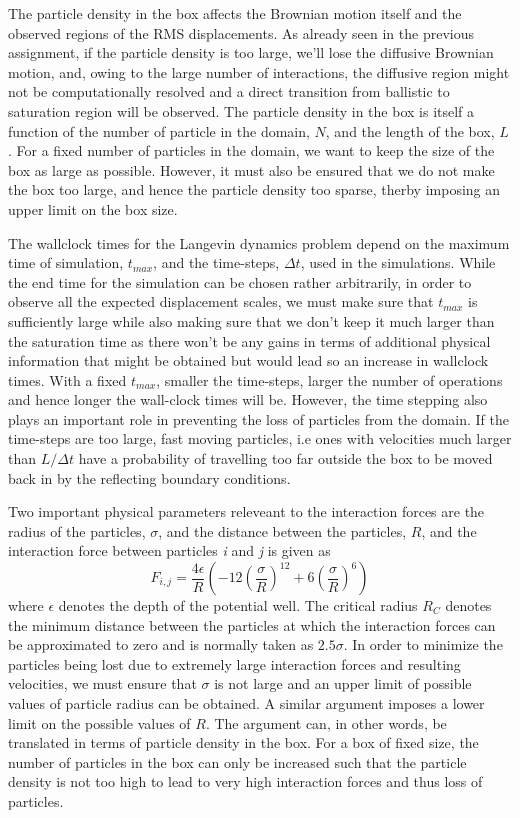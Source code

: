 \documentclass[11pt, oneside]{article}
\begin{document}
The particle density in the box affects the Brownian motion itself and the  observed regions of the RMS displacements. As already seen in the previous assignment, if the particle density is too large, we'll lose the diffusive Brownian motion, and, owing to the large number of interactions, the diffusive region might not be computationally resolved and a direct transition from ballistic to saturation region will be observed. The particle density in the box is itself a function of the number of particle in the domain, $N$, and the length of the box, $L$. For a fixed number of particles in the domain, we want to keep the size of the box as large as possible. However, it must also be ensured that we do not make the box too large, and hence the particle density too sparse, therby imposing an upper limit on the box size.

The wallclock times for the Langevin dynamics problem depend on the maximum time of simulation, $t_{max}$, and the time-steps, $\Delta t$, used in the simulations. While the end time for the simulation can be chosen rather arbitrarily, in order to observe all the expected displacement scales, we must make sure that $t_{max}$ is sufficiently large while also making sure that we don't keep it much larger than the saturation time as there won't be any gains in terms of additional physical information that might be obtained but would lead so an increase in wallclock times. With a fixed  $t_{max}$, smaller the time-steps, larger the number of operations and hence longer the wall-clock times will be. However, the time stepping also plays an important role in preventing the loss of particles from the domain. If the time-steps are too large, fast moving particles, i.e ones with velocities much larger than $L/\Delta t$ have a probability of travelling too far outside the box to be moved back in by the reflecting boundary conditions.

Two important physical parameters releveant to the interaction forces are the radius of the particles, $\sigma$, and the distance between the particles, $R$, and the interaction force between particles \textit{i} and \textit{j} is given as \[F_{i,j} =  \frac{4 \epsilon}{R} \left ( -12 \left ( \frac{\sigma}{R} \right )^{12} + 6 \left ( \frac{\sigma}{R} \right )^{6} \right)\]
where $\epsilon$ denotes the depth of the potential well. The critical radius $R_C$ denotes the minimum distance between the particles at which the interaction forces can be approximated to zero and is normally taken as $2.5 \sigma$. In order to minimize the particles being lost due to extremely large interaction forces and resulting velocities, we must ensure that $\sigma$ is not large and an upper limit of possible values of particle radius can be obtained. A similar argument imposes a lower limit on the possible values of $R$. The argument can, in other words, be translated in terms of particle density in the box. For a box of fixed size, the number of particles in the box can only be increased such that the particle density is not too high to lead to very high interaction forces and thus loss of particles.
\end{document}
